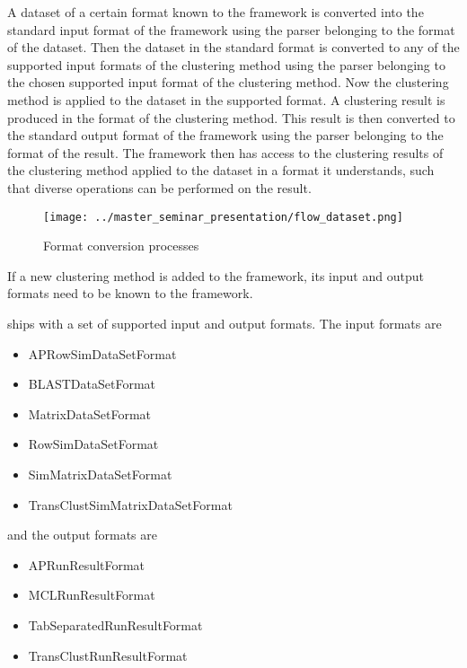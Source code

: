 	A dataset of a certain format known to the framework is converted into the standard input format of the framework using the parser belonging to the format of the dataset. Then the dataset in the standard format is converted to any of the supported input formats of the clustering method using the parser belonging to the chosen supported input format of the clustering method. Now the clustering method is applied to the dataset in the supported format. A clustering result is produced in the format of the clustering method. This result is then converted to the standard output format of the framework using the parser belonging to the format of the result. The framework then has access to the clustering results of the clustering method applied to the dataset in a format it understands, such that diverse operations can be performed on the result.
	
	\begin{figure}[hbtp]
	\caption{Format conversion processes}
	\label{fig_format_conversion_processes}
	\centering
	\texttt{[image: ../master\_seminar\_presentation/flow\_dataset.png]} 
	\end{figure}

	If a new clustering method is added to the framework, its input and output formats need to be known to the framework. 
	
	\clusteval ships with a set of supported input and output formats. The input formats are
	
	\begin{itemize}
		\item APRowSimDataSetFormat
		\item BLASTDataSetFormat
		\item MatrixDataSetFormat
		\item RowSimDataSetFormat
		\item SimMatrixDataSetFormat
		\item TransClustSimMatrixDataSetFormat
	\end{itemize}
	and the output formats are
	\begin{itemize}
		\item APRunResultFormat
		\item MCLRunResultFormat
		\item TabSeparatedRunResultFormat
		\item TransClustRunResultFormat
	\end{itemize}
	
